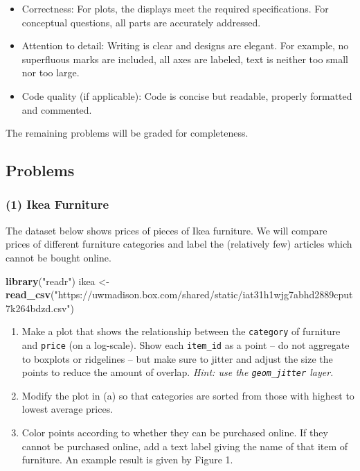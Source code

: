 \documentclass[
]{article}
\newenvironment{Shaded}{\begin{snugshade}}{\end{snugshade}}
\newcommand{\KeywordTok}[1]{\textcolor[rgb]{0.13,0.29,0.53}{\textbf{#1}}}
\newcommand{\NormalTok}[1]{#1}
\newcommand{\StringTok}[1]{\textcolor[rgb]{0.31,0.60,0.02}{#1}}
\providecommand{\tightlist}{%
  \setlength{\itemsep}{0pt}\setlength{\parskip}{0pt}}
\begin{document}
\begin{itemize}
\tightlist
\item
  Correctness: For plots, the displays meet the required specifications.
  For conceptual questions, all parts are accurately addressed.
\item
  Attention to detail: Writing is clear and designs are elegant. For
  example, no superfluous marks are included, all axes are labeled, text
  is neither too small nor too large.
\item
  Code quality (if applicable): Code is concise but readable, properly
  formatted and commented.
\end{itemize}

The remaining problems will be graded for completeness.

\hypertarget{problems}{%
\subsection{Problems}\label{problems}}

\hypertarget{ikea-furniture}{%
\subsubsection{(1) Ikea Furniture}\label{ikea-furniture}}

The dataset below shows prices of pieces of Ikea furniture. We will
compare prices of different furniture categories and label the
(relatively few) articles which cannot be bought online.

\begin{Shaded}
\begin{Highlighting}[]
\KeywordTok{library}\NormalTok{(}\StringTok{"readr"}\NormalTok{)}
\NormalTok{ikea <-}\StringTok{ }\KeywordTok{read_csv}\NormalTok{(}\StringTok{"https://uwmadison.box.com/shared/static/iat31h1wjg7abhd2889cput7k264bdzd.csv"}\NormalTok{)}
\end{Highlighting}
\end{Shaded}

\begin{enumerate}
\def\labelenumi{\alph{enumi}.}
\item
  Make a plot that shows the relationship between the \texttt{category}
  of furniture and \texttt{price} (on a log-scale). Show each
  \texttt{item\_id} as a point -- do not aggregate to boxplots or
  ridgelines -- but make sure to jitter and adjust the size the points
  to reduce the amount of overlap. \emph{Hint: use the
  \texttt{geom\_jitter} layer.}
\item
  Modify the plot in (a) so that categories are sorted from those with
  highest to lowest average prices.
\item
  Color points according to whether they can be purchased online. If
  they cannot be purchased online, add a text label giving the name of
  that item of furniture. An example result is given by Figure 1.
\end{enumerate}
\end{document}
